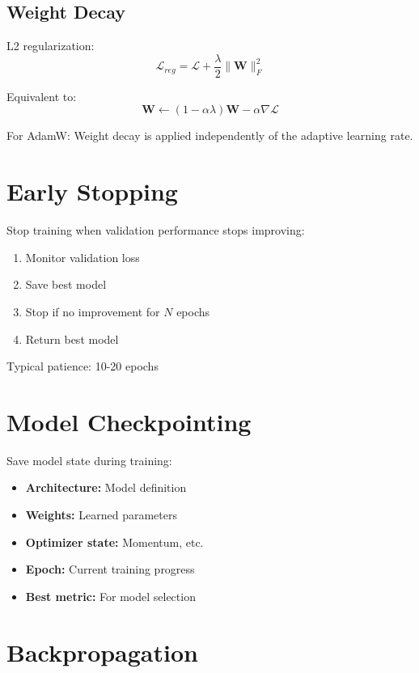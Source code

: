 \subsection{Weight Decay}

L2 regularization:
\begin{equation}
\mathcal{L}_{reg} = \mathcal{L} + \frac{\lambda}{2}\|\mathbf{W}\|_F^2
\end{equation}

Equivalent to:
\begin{equation}
\mathbf{W} \leftarrow (1 - \alpha\lambda)\mathbf{W} - \alpha \nabla \mathcal{L}
\end{equation}

For AdamW: Weight decay is applied independently of the adaptive learning rate.

\section{Early Stopping}

Stop training when validation performance stops improving:
\begin{enumerate}
    \item Monitor validation loss
    \item Save best model
    \item Stop if no improvement for $N$ epochs
    \item Return best model
\end{enumerate}

Typical patience: 10-20 epochs

\section{Model Checkpointing}

Save model state during training:
\begin{itemize}
    \item \textbf{Architecture:} Model definition
    \item \textbf{Weights:} Learned parameters
    \item \textbf{Optimizer state:} Momentum, etc.
    \item \textbf{Epoch:} Current training progress
    \item \textbf{Best metric:} For model selection
\end{itemize}

\section{Backpropagation}

